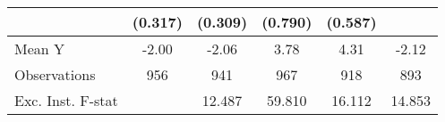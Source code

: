 {\begin{tabular}{l*{5}{c}}
            &     (0.317)         &     (0.309)         &     (0.790)         &     (0.587)         &                     \\
\midrule
Mean Y      &       -2.00         &       -2.06         &        3.78         &        4.31         &       -2.12         \\
Observations&         956         &         941         &         967         &         918         &         893         \\
Exc. Inst. F-stat&                     &      12.487         &      59.810         &      16.112         &      14.853         \\
\bottomrule
\end{tabular}
}
